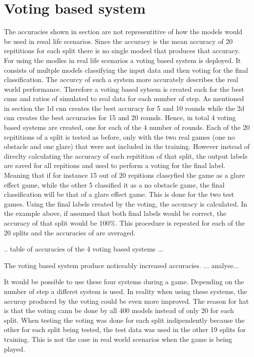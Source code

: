 \chapter{Voting based system}
The accuracies shown in section  are not representitive of how the models would be used in resal life scenarios. Since the accuracy is the mean accuracy of 20 repititions for each split there is no single modeel that produces that accuracy. For using the modles in real life scenarios a voting based system is deployed. It consists of multple models classifying the input data and then voting for the final classification. The accurcy of such a system more accurately describes the real world performance. Therefore a voting based sytsem is created each for the best cnns and ratios of simulated to real data for each number of step. As mentioned in section  the 1d cnn creates the best accuracy for 5 and 10 rounds while the 2d cnn creates the best accuracies for 15 and 20 rounds. Hence, in total 4 voting based systems are created, one for each of the 4 number of rounds. Each of the 20 repititions of a split is tested as before, only with the two real games (one no obstacle and one glare) that were not included in the training. However instead of direclty calculating the accuracy of each repitition of that split, the output labels are saved for all repitions and used to perform a voting for the final label. Meaning that if for instance 15 out of 20 repitions classyfied the game as a glare effect game, while the other 5 classified it as a no obstacle game, the final classification will be that of a glare effect game. This is done for the two test games. Using the final labels created by the voting, the accuracy is calculated. In the example above, if assumed that both final labels would be correct, the accuracy of that split would be 100\%. This procedure is repeated for each of the 20 splits and the accuracies of are averaged. 

.. table of accuracies of the 4 voting based systems ...

The voting based system produce noticeably increased accuracies. ... analyse... 


It would be possible to use these four systems during a game. Depending on the number of step a differet system is used. In reality when using these systems, the accuray produced by the voting could be even more improved. The reason for hat is that the voting cann be done by all 400 models instead of only 20 for each split. When testing the voting was done for each split indipendently because the other for each split being tested, the test data was used in the other 19 splits for training. This is not the case in real world scenarios when the game is being played. 